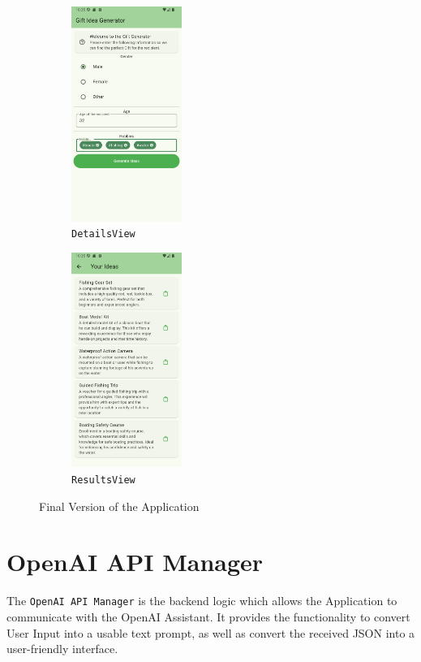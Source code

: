 \begin{figure}[!h]

	\begin{subfigure}{0.5\textwidth}
		\begin{center}
			\includegraphics[height=7cm]{figures/screenshots/new_details_view_cropped.png}
		\end{center}
		\caption{\texttt{DetailsView}}
	\end{subfigure}
	\begin{subfigure}{0.5\textwidth}
		\begin{center}
			\includegraphics[height=7cm]{figures/screenshots/new_results_view_cropped.png}
		\end{center}
		\caption{\texttt{ResultsView}}
	\end{subfigure}
	\caption{Final Version of the Application}
	\label{fig:finalVersion}
\end{figure}

\section*{OpenAI API Manager}

The \texttt{OpenAI API Manager} is the backend logic which allows the Application to communicate with the OpenAI Assistant. It provides the functionality to convert User Input into a usable text prompt, as well as convert the received JSON into a user-friendly interface.

